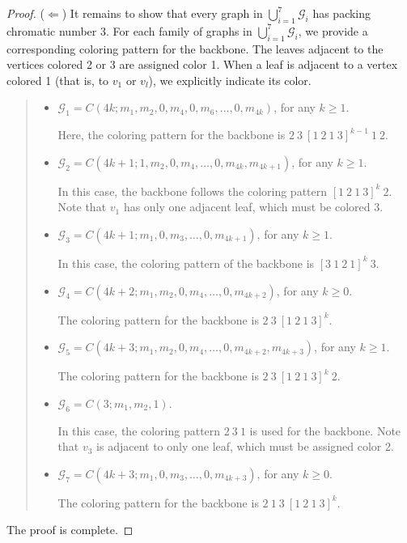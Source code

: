 \documentclass[10pt,a4paper]{amsart}
\begin{document}
\begin{proof}
\vspace{0.3cm}
 ($\Leftarrow$) It remains to show that every graph in $\bigcup_{i=1}^7 \mathcal{G}_i$ has packing chromatic number 3. For each family of graphs in $\bigcup_{i=1}^7 \mathcal{G}_i$, we provide a corresponding coloring pattern for the backbone. The leaves adjacent to the vertices colored 2 or 3 are assigned color 1. When a leaf is adjacent to a vertex colored 1 (that is, to $v_1$ or $v_l$), we explicitly indicate its color.

\begin{quote}
    
\begin{itemize}
        \item $\mathcal{G}_1=C(4k; m_1, m_2, 0,m_4,0, m_6, \ldots,0,m_{4k})$, for any $k\geq 1$. 
        
        
        Here, the coloring pattern for the backbone is $2\ 3\ [1\ 2\ 1\ 3]^{k-1}\ 1\ 2$.
        \item $\mathcal{G}_2=C(4k+1; 1, m_2,0,m_4,\ldots,0,m_{4k},m_{4k+1})$, for any $k\geq 1$.

        
        In this case, the backbone follows the coloring pattern $[1\ 2\ 1\ 3]^k \ 2$. Note that $v_1$ has only one adjacent leaf, which must be colored 3.
        \item $\mathcal{G}_3=C(4k+1; m_1, 0,m_3,\ldots, 0,m_{4k+1})$, for any $k\geq 1$.
    
        In this case, the coloring pattern of the backbone is $[3\ 1\ 2\ 1]^k\ 3$.
    \item $\mathcal{G}_4=C(4k+2; m_1, m_2,0,m_4,\ldots, 0,m_{4k+2})$, for any $k\geq 0$.
    
    The coloring pattern for the backbone is $2\ 3\ [1\ 2\ 1\ 3]^k$.
    \item $\mathcal{G}_5=C(4k+3; m_1, m_2, 0, m_4, \ldots, 0, m_{4k+2},m_{4k+3})$, for any $k\geq 1$.
    
    The coloring pattern for the backbone is $2\ 3\ [1\ 2\ 1\ 3]^k \ 2$.
    \item $\mathcal{G}_6=C(3; m_1,m_2,1)$.

    In this case, the coloring pattern $2\ 3\ 1$ is used for the backbone. Note that $v_3$ is adjacent to only one leaf, which must be assigned color 2.
    
    \item $\mathcal{G}_7=C(4k+3;m_1,0,m_3,\ldots, 0,m_{4k+3})$, for any $k\geq 0$.

    The coloring pattern for the backbone is $2\ 1\ 3\ [1\ 2\ 1\ 3]^k$.
    \end{itemize}

\end{quote}
 The proof is complete.
\end{proof}
\end{document}
